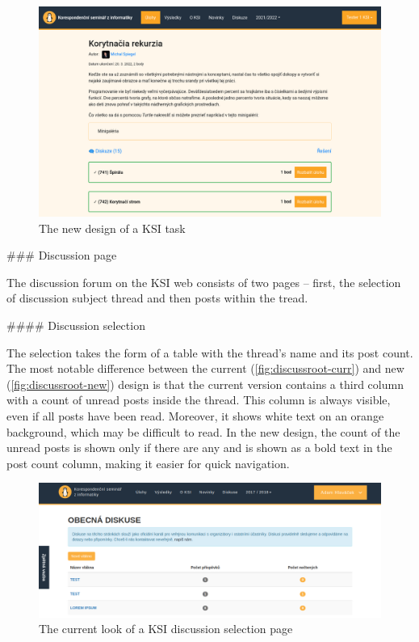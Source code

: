 \documentclass[
  digital, %
  oneside, %
  lof,     %
  nolot,     %
]{fithesis4}
\begin{document}
{\begin{figure}
\includegraphics[width=\textwidth]{assets/img/task-new}
\caption{The new design of a KSI task}
\label{fig:task-new}
\end{figure}


### Discussion page

The discussion forum on the KSI web consists of two pages -- first, the selection of discussion subject thread and then posts within the tread.

#### Discussion selection

The selection takes the form of a table with the thread's name and its post count. The most notable difference between the current (\autoref{fig:discussroot-curr}) and new (\autoref{fig:discussroot-new}) design is that the current version contains a third column with a count of unread posts inside the thread. This column is always visible, even if all posts have been read. Moreover, it shows white text on an orange background, which may be difficult to read. In the new design, the count of the unread posts is shown only if there are any and is shown as a bold text in the post count column, making it easier for quick navigation.

\begin{figure}
\includegraphics[width=\textwidth]{assets/img/discussionroot-curr}
\caption{The current look of a KSI discussion selection page}
\label{fig:discussroot-curr}
\end{figure}

}
\end{document}
